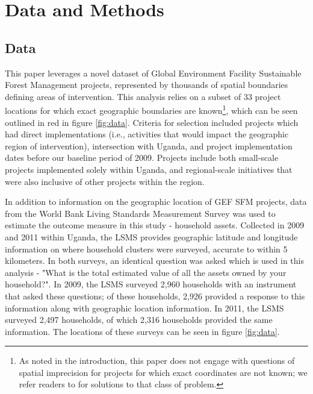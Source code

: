 \documentclass[sustainability,article,submit,moreauthors,pdftex]{Definitions/mdpi}
\begin{document}
\section{Data and Methods}
\subsection{Data}\label{sub:data}
This paper leverages a novel dataset of Global Environment Facility Sustainable Forest Management projects, represented by thousands of spatial boundaries defining areas of intervention. This analysis relies on a subset of 33 project locations for which exact geographic boundaries are known\footnote{As noted in the introduction, this paper does not engage with questions of spatial imprecision for projects for which exact coordinates are not known; we refer readers to \cite{Marty2019AssessingImprecision} for solutions to that class of problem.}, which can be seen outlined in red in figure \ref{fig:data}. Criteria for selection included projects which had direct implementations (i.e., activities that would impact the geographic region of intervention), intersection with Uganda, and project implementation dates before our baseline period of 2009.  Projects include both small-scale projects implemented solely within Uganda, and regional-scale initiatives that were also inclusive of other projects within the region.  
\par
In addition to information on the geographic location of GEF SFM projects, data from the World Bank Living Standards Measurement Survey was used to estimate the outcome measure in this study - household assets.  Collected in 2009 and 2011 within Uganda, the LSMS provides geographic latitude and longitude information on where household clusters were surveyed, accurate to within 5 kilometers.  In both surveys, an identical question was asked which is used in this analysis - "What is the total estimated value of all the assets owned by your household?".  In 2009, the LSMS surveyed 2,960 households with an instrument that asked these questions; of these households, 2,926 provided a response to this information along with geographic location information.  In 2011, the LSMS surveyed 2,497 households, of which 2,316 households provided the same information.  The locations of these surveys can be seen in figure \ref{fig:data}.
\par
\end{document}
